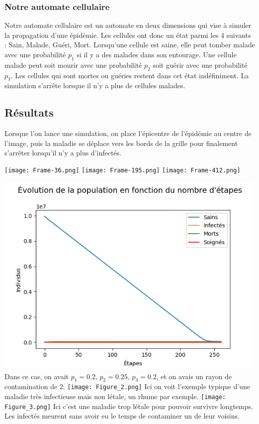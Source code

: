 \documentclass{article}
\begin{document}
\subsubsection{Notre automate cellulaire}
	Notre automate cellulaire est un automate en deux dimensions qui vise à simuler la propagation d'une épidémie. Les cellules ont donc un état parmi les 4 suivants : Sain, Malade, Guéri, Mort. Lorsqu'une cellule est saine, elle peut tomber malade avec une probabilité $p_1$ si il y a des malades dans son entourage. Une cellule malade peut soit mourir avec une probabilité $p_2$ soit guérir avec une probabilité $p_3$. Les cellules qui sont mortes ou guéries restent dans cet état indéfiniment. La simulation s'arrête lorsque il n'y a plus de cellules malades.


\subsection{Résultats}

Lorsque l'on lance une simulation, on place l'épicentre de l'épidémie au centre de l'image, puis la maladie se déplace vers les bords de la grille pour finalement s'arrêter lorsqu'il n'y a plus d'infectés.

	\texttt{[image: Frame-36.png]}
	\texttt{[image: Frame-195.png]} 
	\texttt{[image: Frame-412.png]} 

	\begin{center}
	\includegraphics[scale=1.04]{Figure_1.png}
	Dans ce cas, on avait $p_1 = 0.2$, $p_2 = 0.25$, $p_3 = 0.2$, et on avais un rayon de contamination de 2.
	\texttt{[image: Figure\_2.png]}
	Ici on voit l'exemple typique d'une maladie très infectieuse mais non létale, un rhume par exemple.
	\texttt{[image: Figure\_3.png]} 
Ici c'est une maladie trop létale pour pouvoir survivre longtemps. Les infectés meurent sans avoir eu le temps de contaminer un de leur voisins.

	\end{center}
\end{document}

